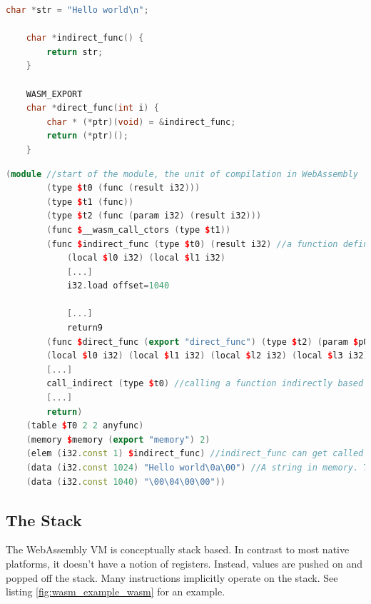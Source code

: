 \documentclass[sigconf]{acmart}
\begin{document}
\begin{lstlisting}[language=C++, caption={A C program, which, when compiled without optimizations, gets translated to the code in Observe \ref{fig:wasm_example_wasm}.}, label=fig:wasm_example_c]
	char *str = "Hello world\n";

	char *indirect_func() {
		return str;
	}

	WASM_EXPORT
	char *direct_func(int i) { 
		char * (*ptr)(void) = &indirect_func;
		return (*ptr)();
	} 
\end{lstlisting}

\begin{lstlisting}[language=C++, caption={The C program in listing \ref{fig:wasm_example_c} gets compiled to this WebAssembly program (with uninteresting parts removed). Observe the indirect call, function table and memory region.}, label={fig:wasm_example_wasm}]
	(module //start of the module, the unit of compilation in WebAssembly
		(type $t0 (func (result i32)))
		(type $t1 (func))
		(type $t2 (func (param i32) (result i32)))
		(func $__wasm_call_ctors (type $t1))
		(func $indirect_func (type $t0) (result i32) //a function definition
			(local $l0 i32) (local $l1 i32)
			[...]
			i32.load offset=1040
			
			[...]
			return9
		(func $direct_func (export "direct_func") (type $t2) (param $p0 i32) (result i32)
		(local $l0 i32) (local $l1 i32) (local $l2 i32) (local $l3 i32) (local $l4 i32) (local $l5 i32) (local $l6 i32) (local $l7 i32)
		[...]
		call_indirect (type $t0) //calling a function indirectly based on the index pushed onto the stack
		[...]
		return)
	(table $T0 2 2 anyfunc)
	(memory $memory (export "memory") 2) 
	(elem (i32.const 1) $indirect_func) //indirect_func can get called indirectly by pushing '1' onto the stack 
	(data (i32.const 1024) "Hello world\0a\00") //A string in memory. There exists no constant storage in WebAssembly.
	(data (i32.const 1040) "\00\04\00\00"))
\end{lstlisting}

\subsection{The Stack}
\label{sec:wasm_stack}
The WebAssembly VM is conceptually stack based. In contrast to most native platforms, it doesn't have a notion of registers. Instead, values are pushed on and popped off the stack. Many instructions implicitly operate on the stack. See listing \ref{fig:wasm_example_wasm} for an example.
\end{document}
